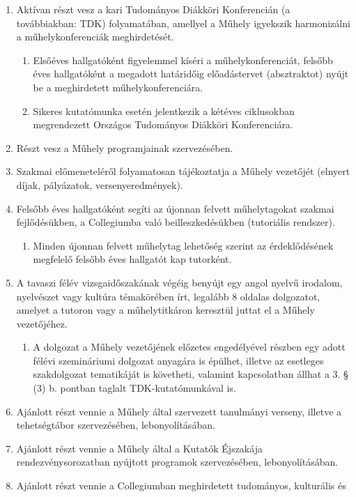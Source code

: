 \documentclass{../styles/rulebook}
\begin{document}
\begin{enumerate}
\begin{enumerate}
		\item Aktívan részt vesz a kari Tudományos Diákköri Konferencián (a továbbiakban: TDK) folyamatában, amellyel a Műhely igyekszik
		harmonizálni a műhelykonferenciák meghirdetését.
		\begin{enumerate}
			\item  Elsőéves hallgatóként
			figyelemmel kíséri a műhelykonferenciát, felsőbb éves hallgatóként a megadott
			határidőig előadástervet (absztraktot) nyújt be a meghirdetett
			műhelykonferenciára.
			\item Sikeres kutatómunka esetén jelentkezik a kétéves ciklusokban megrendezett Országos Tudományos Diákköri Konferenciára.
		\end{enumerate}
		\item Részt vesz a Műhely programjainak szervezésében.
		\item Szakmai előmeneteléről folyamatosan tájékoztatja a Műhely vezetőjét (elnyert díjak, pályázatok, versenyeredmények).
		\item Felsőbb éves hallgatóként segíti az újonnan felvett műhelytagokat szakmai
		fejlődésükben, a Collegiumba való beilleszkedésükben (tutoriális rendszer).
		\begin{enumerate}
			\item Minden újonnan felvett műhelytag lehetőség szerint az érdeklődésének megfelelő felsőbb éves hallgatót kap tutorként.
		\end{enumerate}
		\item A tavaszi félév vizsgaidőszakának végéig benyújt egy angol nyelvű irodalom,
		nyelvészet vagy kultúra témakörében írt, legalább 8 oldalas dolgozatot, amelyet a tutoron vagy a műhelytitkáron keresztül juttat el a Műhely vezetőjéhez. 
		\begin{enumerate}
			\item A dolgozat a Műhely vezetőjének előzetes engedélyével részben egy adott félévi
			szemináriumi dolgozat anyagára is épülhet, illetve az esetleges szakdolgozat tematikáját is követheti, valamint kapcsolatban állhat a 3. § (3) b. pontban taglalt TDK-kutatómunkával is.
		\end{enumerate}
		\item Ajánlott részt vennie a Műhely által szervezett tanulmányi verseny, illetve a tehetségtábor szervezésében, lebonyolításában.
		\item Ajánlott részt vennie a Műhely által a Kutatók Éjszakája rendezvénysorozatban
		nyújtott programok szervezésében, lebonyolításában.
		\item Ajánlott részt vennie a Collegiumban meghirdetett tudományos, kulturális és

\end{enumerate}
\end{enumerate}
\end{document}
